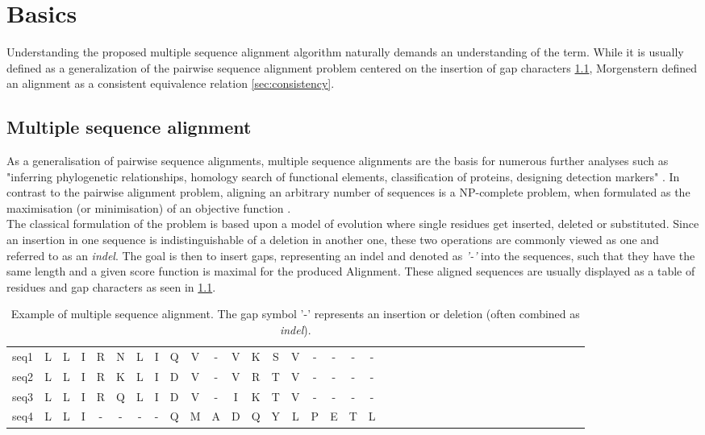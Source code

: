\chapter{Basics}

Understanding the proposed multiple sequence alignment algorithm naturally demands an understanding of the term. While it is usually defined as a generalization of the pairwise sequence alignment problem centered on the insertion of gap characters \ref{sec:msa-classical}, Morgenstern defined an alignment as a consistent equivalence relation \ref{sec:consistency}.


\section{Multiple sequence alignment}
\label{sec:msa-classical}

As a generalisation of pairwise sequence alignments, multiple sequence alignments are the basis for numerous further analyses such as "inferring phylogenetic relationships, homology search of functional elements, classification of proteins, designing detection markers" \cite[pg. 3]{Russell2016}. In contrast to the pairwise alignment problem, aligning an arbitrary number of sequences is a NP-complete problem, when formulated as the maximisation (or minimisation) of an objective function \cite[pg. 172]{Russell2016}.\\
The classical formulation of the problem is based upon a model of evolution where single residues get inserted, deleted or substituted. Since an insertion in one sequence is indistinguishable of a deletion in another one, these two operations are commonly viewed as one and referred to as an \textit{indel}. The goal is then to insert gaps, representing an indel and denoted as \textit{'-'} into the sequences, such that they have the same length and a given score function is maximal for the produced Alignment. These aligned sequences are usually displayed as a table of residues and gap characters as seen in \cref{tab:msa-example}\cite{Russell2016}. 

\begin{table}[h]
\centering
\begin{tabular}{l c c c c c c c c c c c c c c c c c c c c c c c c c c c c c c c c c c c c}
	seq1 & L&L&I&R&N&L&I&Q&V&-&V&K&S&V&-&-&-&- \\
	seq2 & L&L&I&R&K&L&I&D&V&-&V&R&T&V&-&-&-&- \\
	seq3 & L&L&I&R&Q&L&I&D&V&-&I&K&T&V&-&-&-&- \\
	seq4 & L&L&I&-&-&-&-&Q&M&A&D&Q&Y&L&P&E&T&L \\
\end{tabular}
\caption{Example of multiple sequence alignment. The gap symbol '-' represents an insertion or deletion (often combined as \textit{indel}).}
\label{tab:msa-example}
\end{table}


